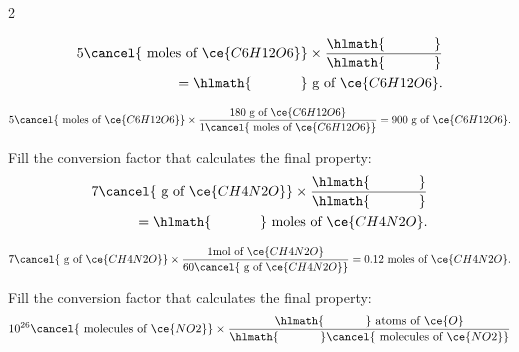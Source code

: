 \documentclass[main.tex]{subfiles}
\begin{document}
\begin{multicols*}{2}
\begin{question}[ID=\the\value{numA}]
\begin{equation*}
\begin{split}
5\cancel{\text{ moles of }\ce{C6H12O6}} \times \dfrac{\hlmath{\hspace{35pt}}}{\hlmath{\hspace{35pt}}}\\
=\hlmath{\hspace{35pt}}\text{ g of }\ce{C6H12O6}.
\end{split}\end{equation*}
\end{question}
\begin{solution}
$
5\cancel{\text{ moles of }\ce{C6H12O6}} \times \dfrac{ 180\text{ g of }\ce{C6H12O6}   }{ 1\cancel{\text{ moles of }\ce{C6H12O6}}      }
=    900 \text{ g of }\ce{C6H12O6}.
$
\hspace{0.1cm}\end{solution}%
\begin{question}[ID=\the\value{numA}]
Fill the conversion factor that calculates the final property:
 \begin{equation*}\begin{split}
7\cancel{\text{ g of }\ce{CH4N2O}} \times \dfrac{\hlmath{\hspace{35pt}}}{\hlmath{\hspace{35pt}}}\\
=\hlmath{\hspace{35pt}}\text{ moles of }\ce{CH4N2O}.
\end{split}\end{equation*}
\end{question}
\begin{solution}
$
7\cancel{\text{ g of }\ce{CH4N2O}} \times \dfrac{1 \text{mol of }\ce{CH4N2O} }{60\cancel{\text{ g of }\ce{CH4N2O}} }
=0.12\text{ moles of }\ce{CH4N2O}.
$
\hspace{0.1cm}\end{solution}%
\begin{question}[ID=\the\value{numA}]
Fill the conversion factor that calculates the final property:
 \begin{equation*}\begin{split}
10^{26}\cancel{\text{ molecules of }\ce{NO2}} \times \dfrac{\hlmath{\hspace{35pt}}\text{ atoms of }\ce{O}}{\hlmath{\hspace{35pt}}\cancel{\text{ molecules of }\ce{NO2}}}\\

\end{split}
\end{equation*}
\end{question}
\end{multicols*}
\end{document}
